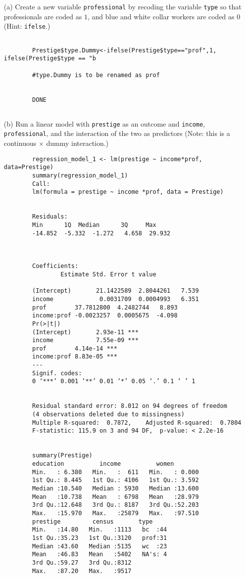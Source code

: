 \documentclass[12pt,letterpaper]{article}
\begin{document}
	\newpage
	\begin{enumerate}
		
		\item [(a)]
		Create a new variable \texttt{professional} by recoding the variable \texttt{type} so that professionals are coded as $1$, and blue and white collar workers are coded as $0$
		 (Hint: \texttt{ifelse}.)
		\begin{verbatim}
		
		Prestige$type.Dummy<-ifelse(Prestige$type=="prof",1, ifelse(Prestige$type == "b
		
		#type.Dummy is to be renamed as prof
		
		
		DONE
		
		\end{verbatim}
		
		\item [(b)]
		Run a linear model with \texttt{prestige} as an outcome and \texttt{income}, \texttt{professional}, and the interaction of the two as predictors (Note: this is a continuous $\times$ dummy interaction.)
	
		\begin{verbatim}
		regression_model_1 <- lm(prestige ~ income*prof, data=Prestige)
		summary(regression_model_1)
		Call:
		lm(formula = prestige ~ income *prof, data = Prestige)
		
	
		Residuals:
		Min      1Q  Median      3Q     Max 
		-14.852  -5.332  -1.272   4.658  29.932 
		
	 
	
		Coefficients:
				Estimate Std. Error t value
		
		(Intercept)       21.1422589  2.8044261   7.539
		income             0.0031709  0.0004993   6.351
		prof        37.7812800  4.2482744   8.893
		income:prof -0.0023257  0.0005675  -4.098
		Pr(>|t|)    
		(Intercept)       2.93e-11 ***
		income            7.55e-09 ***
		prof        4.14e-14 ***
		income:prof 8.83e-05 ***
		---
		Signif. codes:  
		0 ‘***’ 0.001 ‘**’ 0.01 ‘*’ 0.05 ‘.’ 0.1 ‘ ’ 1
	
		
		Residual standard error: 8.012 on 94 degrees of freedom
		(4 observations deleted due to missingness)
		Multiple R-squared:  0.7872,	Adjusted R-squared:  0.7804 
		F-statistic: 115.9 on 3 and 94 DF,  p-value: < 2.2e-16
		
		
		summary(Prestige)
		education          income          women       
		Min.   : 6.380   Min.   :  611   Min.   : 0.000  
		1st Qu.: 8.445   1st Qu.: 4106   1st Qu.: 3.592  
		Median :10.540   Median : 5930   Median :13.600  
		Mean   :10.738   Mean   : 6798   Mean   :28.979  
		3rd Qu.:12.648   3rd Qu.: 8187   3rd Qu.:52.203  
		Max.   :15.970   Max.   :25879   Max.   :97.510  
		prestige         census       type   
		Min.   :14.80   Min.   :1113   bc  :44  
		1st Qu.:35.23   1st Qu.:3120   prof:31  
		Median :43.60   Median :5135   wc  :23  
		Mean   :46.83   Mean   :5402   NA's: 4  
		3rd Qu.:59.27   3rd Qu.:8312            
		Max.   :87.20   Max.   :9517  
		

\end{verbatim}
\end{enumerate}
\end{document}
